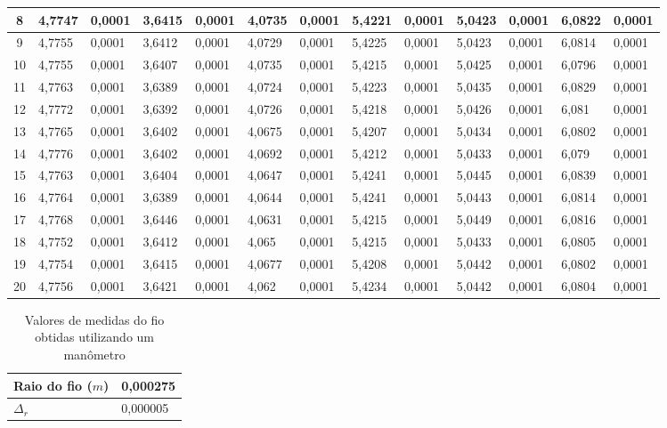 \documentclass[a4paper]{article}
\begin{document}
\begin{table}[!htbp]
\begin{tabular}{|c|l|l|l|l|l|l|l|l|l|l|l|l|}
    	8	&	4,7747 & 0,0001 & 3,6415 & 0,0001 & 4,0735 & 0,0001 & 5,4221 & 0,0001 & 5,0423 & 0,0001 & 6,0822 & 0,0001 \\ \hline
    	9	&	4,7755 & 0,0001 & 3,6412 & 0,0001 & 4,0729 & 0,0001 & 5,4225 & 0,0001 & 5,0423 & 0,0001 & 6,0814 & 0,0001 \\ \hline
    	10	&	4,7755 & 0,0001 & 3,6407 & 0,0001 & 4,0735 & 0,0001 & 5,4215 & 0,0001 & 5,0425 & 0,0001 & 6,0796 & 0,0001 \\ \hline
    	11	&	4,7763 & 0,0001 & 3,6389 & 0,0001 & 4,0724 & 0,0001 & 5,4223 & 0,0001 & 5,0435 & 0,0001 & 6,0829 & 0,0001 \\ \hline
    	12	&	4,7772 & 0,0001 & 3,6392 & 0,0001 & 4,0726 & 0,0001 & 5,4218 & 0,0001 & 5,0426 & 0,0001 & 6,081  & 0,0001 \\ \hline
    	13	&	4,7765 & 0,0001 & 3,6402 & 0,0001 & 4,0675 & 0,0001 & 5,4207 & 0,0001 & 5,0434 & 0,0001 & 6,0802 & 0,0001 \\ \hline
    	14	&	4,7776 & 0,0001 & 3,6402 & 0,0001 & 4,0692 & 0,0001 & 5,4212 & 0,0001 & 5,0433 & 0,0001 & 6,079  & 0,0001 \\ \hline
    	15	&	4,7763 & 0,0001 & 3,6404 & 0,0001 & 4,0647 & 0,0001 & 5,4241 & 0,0001 & 5,0445 & 0,0001 & 6,0839 & 0,0001 \\ \hline
    	16	&	4,7764 & 0,0001 & 3,6389 & 0,0001 & 4,0644 & 0,0001 & 5,4241 & 0,0001 & 5,0443 & 0,0001 & 6,0814 & 0,0001 \\ \hline
    	17	&	4,7768 & 0,0001 & 3,6446 & 0,0001 & 4,0631 & 0,0001 & 5,4215 & 0,0001 & 5,0449 & 0,0001 & 6,0816 & 0,0001 \\ \hline
    	18	&	4,7752 & 0,0001 & 3,6412 & 0,0001 & 4,065  & 0,0001 & 5,4215 & 0,0001 & 5,0433 & 0,0001 & 6,0805 & 0,0001 \\ \hline
    	19	&	4,7754 & 0,0001 & 3,6415 & 0,0001 & 4,0677 & 0,0001 & 5,4208 & 0,0001 & 5,0442 & 0,0001 & 6,0802 & 0,0001 \\ \hline
    	20	&	4,7756 & 0,0001 & 3,6421 & 0,0001 & 4,062  & 0,0001 & 5,4234 & 0,0001 & 5,0442 & 0,0001 & 6,0804 & 0,0001 \\ \hline
	    \end{tabular}
	    \label{tab:MedidasTeL}
\end{table}

\begin{table}[!htbp]
\centering
	\caption{Valores de medidas do fio obtidas utilizando um manômetro}
	\begin{tabular}{|l|l|}
	\hline
	Raio do fio ($m$) & 0,000275 \\ \hline
	\textbf{$\Delta_r$}	& 0,000005 \\ \hline
	\end{tabular}
	\label{tab:Fio}
\end{table}
\end{document}
